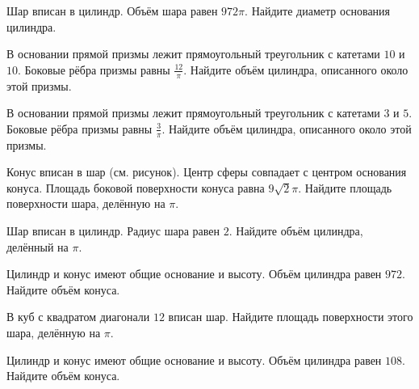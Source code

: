 \documentclass[4apaper]{article}
\begin{document}
\begin{taskBN}{26}
Шар вписан в цилиндр. Объём шара равен $972\pi$. Найдите диаметр основания цилиндра.
\end{taskBN}

\begin{taskBN}{27}
В основании прямой призмы лежит прямоугольный треугольник с катетами $10$ и $10$. Боковые рёбра призмы равны $\frac{12}{\pi}$. Найдите объём цилиндра, описанного около этой призмы.
\end{taskBN}

\begin{taskBN}{28}
В основании прямой призмы лежит прямоугольный треугольник с катетами $3$ и $5$. Боковые рёбра призмы равны $\frac{3}{\pi}$. Найдите объём цилиндра, описанного около этой призмы.
\end{taskBN}

\begin{taskBN}{29}
Конус вписан в шар (см. рисунок). Центр сферы совпадает с центром основания конуса. Площадь боковой поверхности конуса равна $9\sqrt{2}\pi$. Найдите площадь поверхности шара, делённую на $\pi$.
\end{taskBN}

\begin{taskBN}{30}
Шар вписан в цилиндр. Радиус шара равен $2$. Найдите объём цилиндра, делённый на $\pi$.
\end{taskBN}

\begin{taskBN}{31}
Цилиндр и конус имеют общие основание и высоту. Объём цилиндра равен $972$. Найдите объём конуса.
\end{taskBN}

\begin{taskBN}{32}
В куб с квадратом диагонали $12$ вписан шар. Найдите площадь поверхности этого шара, делённую на $\pi$.
\end{taskBN}

\begin{taskBN}{33}
Цилиндр и конус имеют общие основание и высоту. Объём цилиндра равен $108$. Найдите объём конуса.
\end{taskBN}
\end{document}
